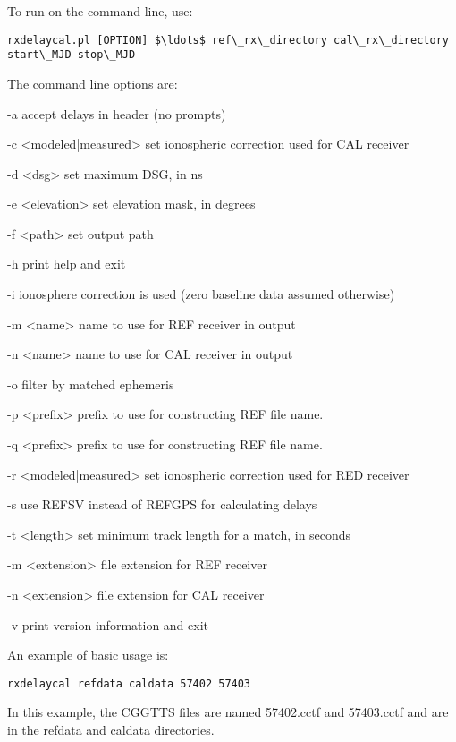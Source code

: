 To run  on the command line, use:
\begin{lstlisting}[mathescape=true]
rxdelaycal.pl [OPTION] $\ldots$ ref\_rx\_directory cal\_rx\_directory start\_MJD stop\_MJD
\end{lstlisting}
The command line options are:
\begin{description*}
	\item[-a]	accept delays in header (no prompts)
	\item[-c  \textless modeled|measured\textgreater] set ionospheric correction used for CAL receiver
	\item[-d  \textless dsg\textgreater] set maximum DSG, in ns
	\item[-e  \textless elevation\textgreater] set elevation mask, in degrees
	\item[-f  \textless path\textgreater] set output path
	\item[-h]	print help and exit
	\item[-i] ionosphere correction is used (zero baseline data assumed otherwise)
	\item[-m  \textless name\textgreater] name to use for REF receiver in output
	\item[-n  \textless name\textgreater] name to use for CAL receiver in output
	\item[-o] filter by matched ephemeris
	\item[-p \textless prefix\textgreater] prefix to use for constructing REF file name.
	\item[-q \textless prefix\textgreater] prefix to use for constructing REF file name.
	\item[-r  \textless modeled|measured\textgreater] set ionospheric correction used for RED receiver
	\item[-s]  use REFSV instead of REFGPS for calculating delays
	\item[-t  \textless length\textgreater] set minimum track length for a match, in seconds
	\item[-m  \textless extension\textgreater] file extension for REF receiver
	\item[-n  \textless extension\textgreater] file extension for CAL receiver
	\item[-v]	print version information and exit
\end{description*}

An example of basic usage is:
\begin{lstlisting}
rxdelaycal refdata caldata 57402 57403
\end{lstlisting}
In this example, the CGGTTS files are named 57402.cctf and 57403.cctf and are in the refdata and caldata directories.

